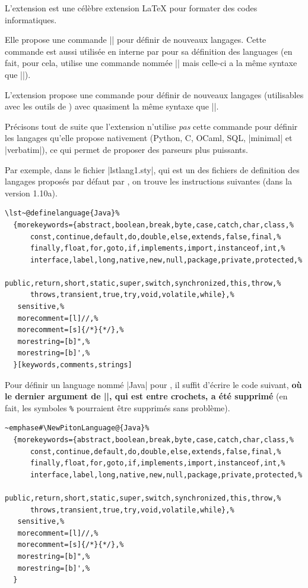 \documentclass[dvipsnames,svgnames]{article}
\begin{document}
\label{NewPitonLanguage}

\medskip
L'extension  est une célèbre extension LaTeX pour formater des codes informatiques.   

\medskip
Elle propose une commande |\lstdefinelanguage| pour définir de nouveaux langages. Cette
commande est aussi utilisée en interne par  pour sa définition des languages
(en fait, pour cela,  utilise une commande nommée |\lst@definelanguage| mais
celle-ci a la même syntaxe que |\lstdefinelanguage|).

\medskip
L'extension  propose une commande  pour
définir de nouveaux langages (utilisables avec les outils de ) avec quasiment
la même syntaxe que |\lstdefinelanguage|.

\medskip
Précisons tout de suite que l'extension  n'utilise \emph{pas} cette commande
pour définir les langages qu'elle propose nativement (Python, C, OCaml, SQL, |minimal| et
|verbatim|), ce qui permet de proposer des parseurs plus puissants. 

\medskip
Par exemple, dans le fichier |lstlang1.sty|, qui est un des fichiers de definition des
langages proposés par défaut par , on trouve les instructions suivantes
(dans la version 1.10a).

\begin{Verbatim}[formatcom=\small\color{gray}]
\lst~@definelanguage{Java}%
  {morekeywords={abstract,boolean,break,byte,case,catch,char,class,%
      const,continue,default,do,double,else,extends,false,final,%
      finally,float,for,goto,if,implements,import,instanceof,int,%
      interface,label,long,native,new,null,package,private,protected,%
      public,return,short,static,super,switch,synchronized,this,throw,%
      throws,transient,true,try,void,volatile,while},%
   sensitive,%
   morecomment=[l]//,%
   morecomment=[s]{/*}{*/},%
   morestring=[b]",%
   morestring=[b]',%
  }[keywords,comments,strings]
\end{Verbatim}

\medskip
Pour définir un language nommé |Java| pour , il suffit d'écrire le code
suivant, {\bfseries où le dernier argument de |\lst@definelanguage|, qui est entre
  crochets, a été supprimé} (en fait, les symboles \verb+%+ pourraient être supprimés sans
problème).

\medskip
\begin{small}
\begin{Verbatim}
~emphase#\NewPitonLanguage@{Java}%
  {morekeywords={abstract,boolean,break,byte,case,catch,char,class,%
      const,continue,default,do,double,else,extends,false,final,%
      finally,float,for,goto,if,implements,import,instanceof,int,%
      interface,label,long,native,new,null,package,private,protected,%
      public,return,short,static,super,switch,synchronized,this,throw,%
      throws,transient,true,try,void,volatile,while},%
   sensitive,%
   morecomment=[l]//,%
   morecomment=[s]{/*}{*/},%
   morestring=[b]",%
   morestring=[b]',%
  }
\end{Verbatim}
\end{small}
\end{document}
